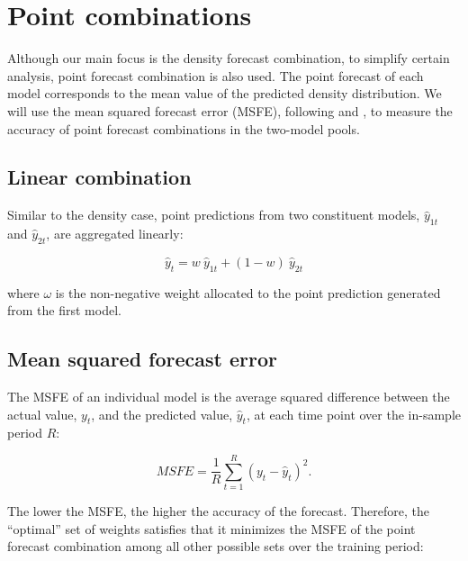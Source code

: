 \documentclass{monashthesis}
\begin{document}
\hypertarget{point-combinations}{%
\section{Point combinations}\label{point-combinations}}

Although our main focus is the density forecast combination, to simplify certain analysis, point forecast combination is also used. The point forecast of each model corresponds to the mean value of the predicted density distribution. We will use the mean squared forecast error (MSFE), following \textcite{BG69} and \textcite{SW09}, to measure the accuracy of point forecast combinations in the two-model pools.

\hypertarget{linear-combination}{%
\subsection{Linear combination}\label{linear-combination}}

Similar to the density case, point predictions from two constituent models, \(\hat y_{1t}\) and \(\hat y_{2t}\), are aggregated linearly:

\begin{equation}
\label{eqn:PC1}
\hat y_t = w \ \hat y_{1t} + (1-w) \ \hat y_{2t}
\end{equation}

where \(\omega\) is the non-negative weight allocated to the point prediction generated from the first model.

\hypertarget{mean-squared-forecast-error}{%
\subsection{Mean squared forecast error}\label{mean-squared-forecast-error}}

The MSFE of an individual model is the average squared difference between the actual value, \(y_t\), and the predicted value, \(\hat y_t\), at each time point over the in-sample period \(R\):

\begin{equation}
\label{eqn:MSFE1}
MSFE = \frac{1}{R} \sum^R_{t=1} (y_t - \hat y_t)^2.
\end{equation}

The lower the MSFE, the higher the accuracy of the forecast. Therefore, the ``optimal'' set of weights satisfies that it minimizes the MSFE of the point forecast combination among all other possible sets over the training period:
\end{document}
